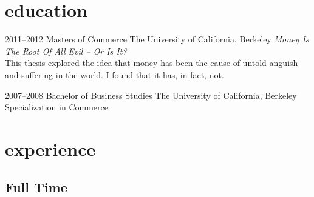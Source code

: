 \documentclass[]{friggeri-cv-a4}
\begin{document}
\section{education}

\begin{entrylist}


\entry
{2011--2012}
{Masters {\normalfont of Commerce}}
{The University of California, Berkeley}
{\emph{Money Is The Root Of All Evil -- Or Is It?} \\ This thesis explored the idea that money has been the cause of untold anguish and suffering in the world. I found that it has, in fact, not.}


\entry
{2007--2008}
{Bachelor {\normalfont of Business Studies}}
{The University of California, Berkeley}
{Specialization in Commerce}


\end{entrylist}


\section{experience}

\subsection{Full Time}
\end{document}
